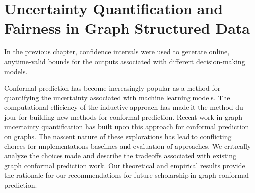 \chapter{Uncertainty Quantification and Fairness in Graph Structured Data}
In the previous chapter, confidence intervals were used to generate online, anytime-valid bounds for the outputs associated with different decision-making models.

Conformal prediction has become increasingly popular as a method for quantifying the 
uncertainty associated with machine learning models. 
The computational efficiency of the inductive approach has made it the method du jour for building new methods for conformal prediction.
Recent work in graph uncertainty quantification has built upon this approach for conformal prediction on graphs.
The nascent nature of these explorations has lead to conflicting choices for implementations baselines and evaluation of approaches.
We critically analyze the choices made and describe the tradeoffs associated with existing graph conformal prediction work. 
Our theoretical and empirical results provide the rationale for our recommendations for future scholarship in graph conformal prediction.

